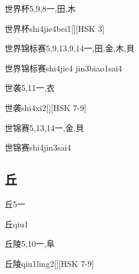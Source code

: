 \begin{Entry}{世界杯}{5,9,8}{⼀,⽥,⽊}
  \begin{Phonetics}{世界杯}{shi4jie4bei1}[][HSK 3]
  \end{Phonetics}
\end{Entry}

\begin{Entry}{世界锦标赛}{5,9,13,9,14}{⼀,⽥,⾦,⽊,⾙}
  \begin{Phonetics}{世界锦标赛}{shi4jie4 jin3biao1sai4}
  \end{Phonetics}
\end{Entry}

\begin{Entry}{世袭}{5,11}{⼀,⾐}
  \begin{Phonetics}{世袭}{shi4xi2}[][HSK 7-9]
  \end{Phonetics}
\end{Entry}

\begin{Entry}{世锦赛}{5,13,14}{⼀,⾦,⾙}
  \begin{Phonetics}{世锦赛}{shi4jin3sai4}
  \end{Phonetics}
\end{Entry}

\subsection*{丘}

\begin{Entry}{丘}{5}{⼀}
  \begin{Phonetics}{丘}{qiu1}
  \end{Phonetics}
\end{Entry}

\begin{Entry}{丘陵}{5,10}{⼀,⾩}
  \begin{Phonetics}{丘陵}{qiu1ling2}[][HSK 7-9]
  \end{Phonetics}
\end{Entry}

